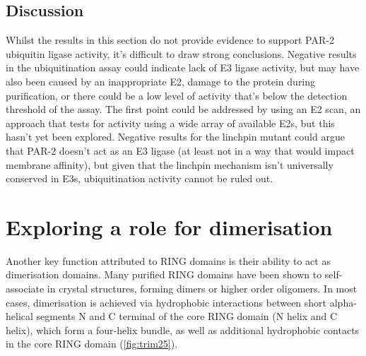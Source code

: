 \documentclass[12pt]{"report"}
\begin{document}
\subsection{Discussion}

Whilst the results in this section do not provide evidence to support PAR-2 ubiquitin ligase activity, it's difficult to draw strong conclusions. Negative results in the ubiquitination assay could indicate lack of E3 ligase activity, but may have  also been caused by an inappropriate E2, damage to the protein during purification, or there could be a low level of activity that's below the detection threshold of the assay. The first point could be addressed by using an E2 scan, an approach that tests for activity using a wide array of available E2s, but this hasn't yet been explored. Negative results for the linchpin mutant could argue that PAR-2 doesn't act as an E3 ligase (at least not in a way that would impact membrane affinity), but given that the linchpin mechanism isn't universally conserved in E3s, ubiquitination activity cannot be ruled out.\\


\clearpage
\section{Exploring a role for dimerisation}

Another key function attributed to RING domains is their ability to act as dimerisation domains. Many purified RING domains have been shown to self-associate in crystal structures, forming dimers or higher order oligomers. In most cases, dimerisation is achieved via hydrophobic interactions between short alpha-helical segments N and C terminal of the core RING domain (N helix and C helix), which form a four-helix bundle, as well as additional hydrophobic contacts in the core RING domain (\cref{fig:trim25}). \\
\end{document}
